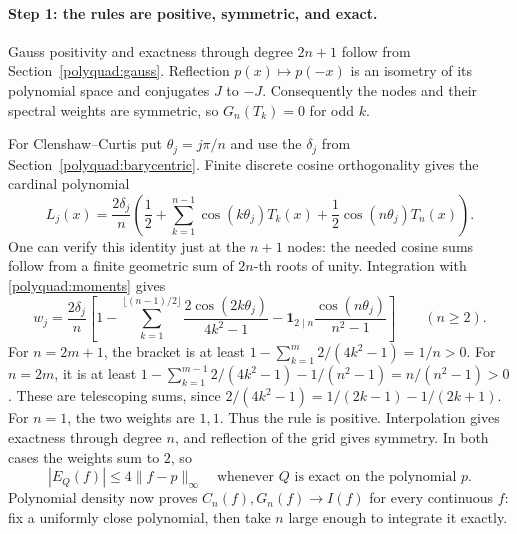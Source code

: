 \documentclass[11pt]{article}
\theoremstyle{remark}
\numberwithin{equation}{section}
\begin{document}
\paragraph{Step 1: the rules are positive, symmetric, and exact.}
Gauss positivity and exactness through degree $2n+1$ follow from
Section~\ref{polyquad:gauss}. Reflection $p(x)\mapsto p(-x)$ is an
isometry of its polynomial space and conjugates $J$ to $-J$. Consequently
the nodes and their spectral weights are symmetric, so $G_n(T_k)=0$
for odd $k$.

For Clenshaw--Curtis put $\theta_j=j\pi/n$ and use the $\delta_j$
from Section~\ref{polyquad:barycentric}. Finite discrete cosine
orthogonality gives the cardinal polynomial
\[
 L_j(x)=\frac{2\delta_j}{n}
  \left(\frac12+\sum_{k=1}^{n-1}\cos(k\theta_j)T_k(x)
             +\frac12\cos(n\theta_j)T_n(x)\right).
\]
One can verify this identity just at the $n+1$ nodes: the needed cosine
sums follow from a finite geometric sum of $2n$-th roots of unity.
Integration with \eqref{polyquad:moments} gives
\begin{equation}
 w_j=\frac{2\delta_j}{n}\left[
  1-\sum_{k=1}^{\lfloor(n-1)/2\rfloor}
       \frac{2\cos(2k\theta_j)}{4k^2-1}
  -\boldsymbol{1}_{2\mid n}\frac{\cos(n\theta_j)}{n^2-1}
  \right] \qquad(n\ge2).
 \label{polyquad:cc-weights}
\end{equation}
For $n=2m+1$, the bracket is at least
$1-\sum_{k=1}^m2/(4k^2-1)=1/n>0$.
For $n=2m$, it is at least
$1-\sum_{k=1}^{m-1}2/(4k^2-1)-1/(n^2-1)=n/(n^2-1)>0$.
These are telescoping sums, since
$2/(4k^2-1)=1/(2k-1)-1/(2k+1)$.
For $n=1$, the two weights are $1,1$.
Thus the rule is positive. Interpolation gives exactness through degree
$n$, and reflection of the grid gives symmetry. In both cases the
weights sum to $2$, so
\begin{equation}
 |E_Q(f)|\le4\|f-p\|_\infty
 \quad\text{whenever $Q$ is exact on the polynomial $p$.}
 \label{polyquad:positive-error}
\end{equation}
Polynomial density now proves $C_n(f),G_n(f)\to I(f)$ for every
continuous $f$: fix a uniformly close polynomial, then take $n$ large
enough to integrate it exactly.
\end{document}
